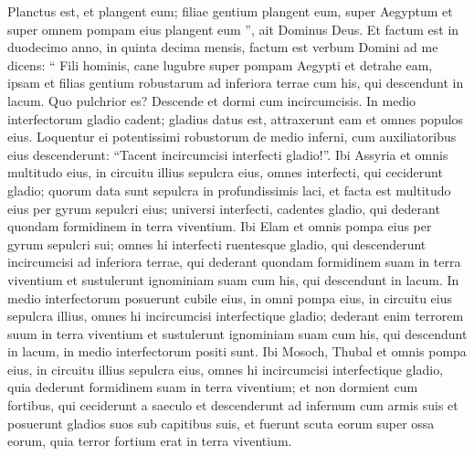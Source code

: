 \begin{biblechapter}
\begin{biblechapter}
\begin{biblechapter}
\begin{biblechapter}
\begin{biblechapter}
\begin{biblechapter}
\begin{biblechapter}
\begin{biblechapter}
\begin{biblechapter}
\begin{biblechapter}
\begin{biblechapter}
\begin{biblechapter}
\begin{biblechapter}
\begin{biblechapter}
\begin{biblechapter}
\begin{biblechapter}
\begin{biblechapter}
\begin{biblechapter}
\begin{biblechapter}
\begin{biblechapter}
\begin{biblechapter}
\begin{biblechapter}
\begin{biblechapter}
\begin{biblechapter}
\begin{biblechapter}
\begin{biblechapter}
\begin{biblechapter}
\begin{biblechapter}
\begin{biblechapter}
\begin{biblechapter}
\begin{biblechapter}
\begin{biblechapter}
 \verse Planctus est, et plangent eum; filiae gentium plangent eum, super Aegyptum et super omnem pompam eius plangent eum ”, ait Dominus Deus.
 \verse Et factum est in duodecimo anno, in quinta decima mensis, factum est verbum Domini ad me dicens: 
\verse “ Fili hominis, cane lugubre super pompam Aegypti et detrahe eam, ipsam et filias gentium robustarum ad inferiora terrae cum his, qui descendunt in lacum.
 \verse Quo pulchrior es?
 Descende et dormi cum incircumcisis.
 \verse In medio interfectorum gladio cadent; gladius datus est, attraxerunt eam et omnes populos eius. 
\verse Loquentur ei potentissimi robustorum de medio inferni, cum auxiliatoribus eius descenderunt:
 “Tacent incircumcisi interfecti gladio!”.
 \verse Ibi Assyria et omnis multitudo eius, in circuitu illius sepulcra eius, omnes interfecti, qui ceciderunt gladio; 
\verse quorum data sunt sepulcra in profundissimis laci, et facta est multitudo eius per gyrum sepulcri eius; universi interfecti, cadentes gladio, qui dederant quondam formidinem in terra viventium.
 \verse Ibi Elam et omnis pompa eius per gyrum sepulcri sui; omnes hi interfecti ruentesque gladio, qui descenderunt incircumcisi ad inferiora terrae, qui dederant quondam formidinem suam in terra viventium et sustulerunt ignominiam suam cum his, qui descendunt in lacum. 
\verse In medio interfectorum posuerunt cubile eius, in omni pompa eius, in circuitu eius sepulcra illius, omnes hi incircumcisi interfectique gladio; dederant enim terrorem suum in terra viventium et sustulerunt ignominiam suam cum his, qui descendunt in lacum, in medio interfectorum positi sunt.
 \verse Ibi Mosoch, Thubal et omnis pompa eius, in circuitu illius sepulcra eius, omnes hi incircumcisi interfectique gladio, quia dederunt formidinem suam in terra viventium; 
\verse et non dormient cum fortibus, qui ceciderunt a saeculo et descenderunt ad infernum cum armis suis et posuerunt gladios suos sub capitibus suis, et fuerunt scuta eorum super ossa eorum, quia terror fortium erat in terra viventium. 

\end{biblechapter}
\end{biblechapter}
\end{biblechapter}
\end{biblechapter}
\end{biblechapter}
\end{biblechapter}
\end{biblechapter}
\end{biblechapter}
\end{biblechapter}
\end{biblechapter}
\end{biblechapter}
\end{biblechapter}
\end{biblechapter}
\end{biblechapter}
\end{biblechapter}
\end{biblechapter}
\end{biblechapter}
\end{biblechapter}
\end{biblechapter}
\end{biblechapter}
\end{biblechapter}
\end{biblechapter}
\end{biblechapter}
\end{biblechapter}
\end{biblechapter}
\end{biblechapter}
\end{biblechapter}
\end{biblechapter}
\end{biblechapter}
\end{biblechapter}
\end{biblechapter}
\end{biblechapter}
